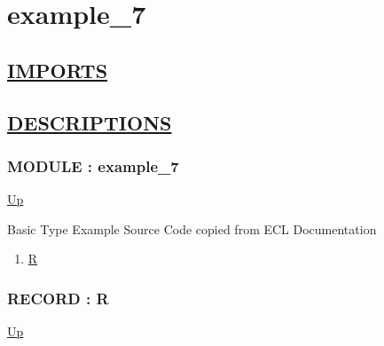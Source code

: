\chapter*{example\_7}
\hypertarget{ecldoc:toc:example_7}{}

\section*{\underline{IMPORTS}}

\section*{\underline{DESCRIPTIONS}}
\subsection*{MODULE : example\_7}
\hypertarget{ecldoc:example_7}{}
\par
\begin{minipage}[t]{\textwidth}
\begin{flushleft}
  
\end{flushleft}
\end{minipage}
\hyperlink{ecldoc:toc:root}{Up} \\
\par
Basic Type Example Source Code copied from ECL Documentation \\
\par
\begin{enumerate}
\item \hyperlink{ecldoc:example_7.r}{R}
\end{enumerate}
\subsection*{RECORD : R}
\hypertarget{ecldoc:example_7.r}{}
\par
\begin{minipage}[t]{\textwidth}
\begin{flushleft}
  
\end{flushleft}
\end{minipage}
\hyperlink{ecldoc:example_7}{Up} \\
\par
\par

